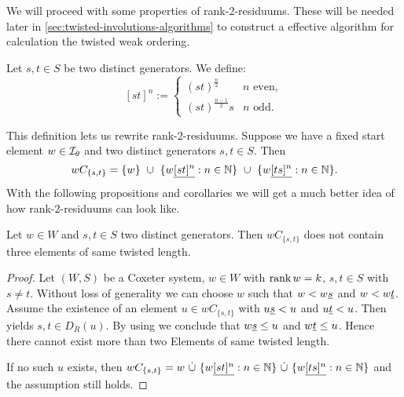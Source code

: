 We will proceed with some properties of rank-2-residuums. These will be needed later in \ref{sec:twisted-involutions-algorithms} to construct a effective algorithm for calculation the twisted weak ordering.

\begin{defi}
	Let $s,t \in S$ be two distinct generators. We define:
	$$[st]^n :=
	\begin{cases}
	(st)^{\frac{n}{2}} & n \textrm{ even}, \\
	(st)^{\frac{n-1}{2}}s & n \textrm{ odd}. 
	\end{cases}$$
\end{defi}

This definition lets us rewrite rank-2-residuums. Suppose we have a fixed start element $w \in \mathcal{I}_{\theta}$ and two distinct generators $s,t \in S$. Then
$$ wC_{\{s,t\}} = \{ w \} \ \cup \ \{ w \underline{[st]^n} : n \in \mathbb{N} \} \ \cup \ \{ w \underline{[ts]^n} : n \in \mathbb{N} \}. $$
With the following propositions and corollaries we will get a much better idea of how rank-2-residuums can look like.

\begin{prop}
	Let $w \in W$ and $s,t \in S$ two distinct generators. Then $wC_{\{s,t\}}$ does not contain three elements of same twisted length.

	\begin{proof}
		Let $(W,S)$ be a Coxeter system, $w \in W$ with $\operatorname{rank} w = k$, $s, t \in S$ with $s \neq t$. Without loss of generality we can choose $w$ such that $w < w \underline{s}$ and $w < w \underline{t}$. Assume the existence of an element $u \in wC_{\{s,t\}}$ with $u \underline{s} < u$ and $u \underline{t} < u$. Then \cite[Lemma 3.8]{hultman:comb-twisted-invo} yields $s,t \in D_R(u)$. By using \cite[Lemma 3.9]{hultman:comb-twisted-invo} we conclude that $w \underline{s} \leq u$ and $w \underline{t} \leq u$. Hence there cannot exist more than two Elements of same twisted length.

		If no such $u$ exists, then $wC_{\{s,t\}} = w \ \dot \cup \ \{ w \ul{[st]^n} : n \in \nn \} \ \dot \cup \ \{ w \ul{[ts]^n} : n \in \nn \}$ and the assumption still holds.
	\end{proof}
\end{prop}

